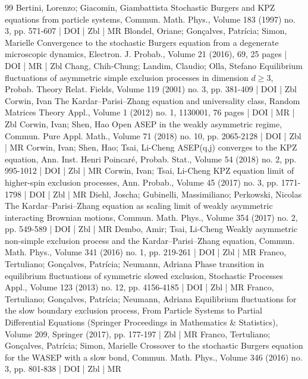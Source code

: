\begin{thebibliography}{99}
Bertini, Lorenzo; Giacomin, Giambattista Stochastic Burgers and KPZ equations from particle systems, Commun. Math. Phys., Volume 183 (1997) no. 3, pp. 571-607 | DOI | Zbl | MR
Blondel, Oriane; Gonçalves, Patrícia; Simon, Marielle Convergence to the stochastic Burgers equation from a degenerate microscopic dynamics, Electron. J. Probab., Volume 21 (2016), 69, 25 pages | DOI | MR | Zbl
Chang, Chih-Chung; Landim, Claudio; Olla, Stefano Equilibrium fluctuations of asymmetric simple exclusion processes in dimension $d\ge 3$, Probab. Theory Relat. Fields, Volume 119 (2001) no. 3, pp. 381-409 | DOI | Zbl
Corwin, Ivan The Kardar–Parisi–Zhang equation and universality class, Random Matrices Theory Appl., Volume 1 (2012) no. 1, 1130001, 76 pages | DOI | MR | Zbl
Corwin, Ivan; Shen, Hao Open ASEP in the weakly asymmetric regime, Commun. Pure Appl. Math., Volume 71 (2018) no. 10, pp. 2065-2128 | DOI | Zbl | MR
Corwin, Ivan; Shen, Hao; Tsai, Li-Cheng ASEP(q,j) converges to the KPZ equation, Ann. Inst. Henri Poincaré, Probab. Stat., Volume 54 (2018) no. 2, pp. 995-1012 | DOI | Zbl | MR
Corwin, Ivan; Tsai, Li-Cheng KPZ equation limit of higher-spin exclusion processes, Ann. Probab., Volume 45 (2017) no. 3, pp. 1771-1798 | DOI | Zbl | MR
Diehl, Joscha; Gubinelli, Massimiliano; Perkowski, Nicolas The Kardar–Parisi–Zhang equation as scaling limit of weakly asymmetric interacting Brownian motions, Commun. Math. Phys., Volume 354 (2017) no. 2, pp. 549-589 | DOI | Zbl | MR
Dembo, Amir; Tsai, Li-Cheng Weakly asymmetric non-simple exclusion process and the Kardar–Parisi–Zhang equation, Commun. Math. Phys., Volume 341 (2016) no. 1, pp. 219-261 | DOI | Zbl | MR
Franco, Tertuliano; Gonçalves, Patrícia; Neumann, Adriana Phase transition in equilibrium fluctuations of symmetric slowed exclusion, Stochastic Processes Appl., Volume 123 (2013) no. 12, pp. 4156-4185 | DOI | Zbl | MR
Franco, Tertuliano; Gonçalves, Patrícia; Neumann, Adriana Equilibrium fluctuations for the slow boundary exclusion process, From Particle Systems to Partial Differential Equations (Springer Proceedings in Mathematics \& Statistics), Volume 209, Springer (2017), pp. 177-197 | Zbl | MR
Franco, Tertuliano; Gonçalves, Patrícia; Simon, Marielle Crossover to the stochastic Burgers equation for the WASEP with a slow bond, Commun. Math. Phys., Volume 346 (2016) no. 3, pp. 801-838 | DOI | Zbl | MR

\end{thebibliography}
